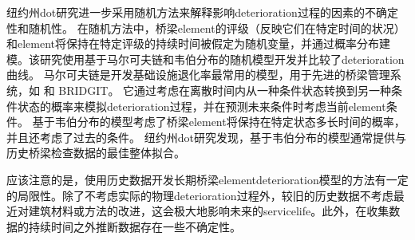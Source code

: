 纽约州\acrlong*{dot}研究进一步采用随机方法来解释影响\gls*{deterioration}过程的因素的不确定性和随机性。 在随机方法中，桥梁\gls*{element}的评级（反映它们在特定时间的状况）和\gls*{element}将保持在特定评级的持续时间被假定为随机变量，并通过概率分布建模。该研究使用基于马尔可夫链和韦伯分布的随机模型开发并比较了\gls*{deterioration}曲线。 马尔可夫链是开发基础设施退化率最常用的模型，用于先进的桥梁管理系统，如 \pontis 和 BRIDGIT。 它通过考虑在离散时间内从一种条件状态转换到另一种条件状态的概率来模拟\gls*{deterioration}过程，并在预测未来条件时考虑当前\gls*{element}条件。 基于韦伯分布的模型考虑了桥梁\gls*{element}将保持在特定状态多长时间的概率，并且还考虑了过去的条件。 纽约州\acrlong*{dot}研究发现，基于韦伯分布的模型通常提供与历史桥梁检查数据的最佳整体拟合。

应该注意的是，使用历史数据开发长期桥梁\gls*{element}\gls*{deterioration}模型的方法有一定的局限性。除了不考虑实际的物理\gls*{deterioration}过程外，较旧的历史数据不考虑最近对建筑材料或方法的改进，这会极大地影响未来的\gls*{servicelife}。此外，在收集数据的持续时间之外推断数据存在一些不确定性。

